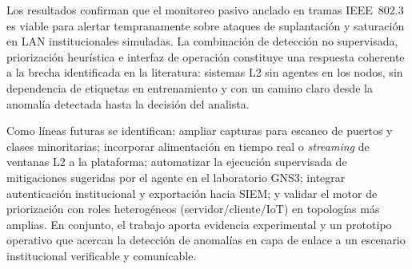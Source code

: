 \documentclass[conference]{IEEEtran}
\newcommand{\portscan}{escaneo de puertos}
\begin{document}
Los resultados confirman que el monitoreo pasivo anclado en tramas
IEEE~802.3 es viable para alertar tempranamente sobre ataques de
suplantación y saturación en LAN institucionales simuladas. La
combinación de detección no supervisada, priorización heurística e
interfaz de operación constituye una respuesta coherente a la brecha
identificada en la literatura: sistemas L2 sin agentes en los nodos,
sin dependencia de etiquetas en entrenamiento y con un camino claro
desde la anomalía detectada hasta la decisión del analista.

Como líneas futuras se identifican: ampliar capturas para \portscan{} y
clases minoritarias; incorporar alimentación en tiempo real o
\textit{streaming} de ventanas L2 a la plataforma; automatizar la
ejecución supervisada de mitigaciones sugeridas por el agente en el
laboratorio GNS3; integrar autenticación institucional y exportación hacia
SIEM; y validar el motor de priorización con roles heterogéneos
(servidor/cliente/IoT) en topologías más amplias. En conjunto, el
trabajo aporta evidencia experimental y un prototipo operativo que
acercan la detección de anomalías en capa de enlace a un escenario
institucional verificable y comunicable.
\end{document}
